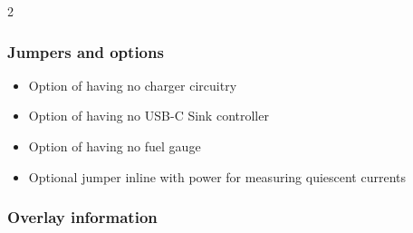 \documentclass[11px]{specification}
\begin{document}
\begin{multicols}{2}
\subsubsection{Jumpers and options}
\begin{itemize}
    \item Option of having no charger circuitry
    \item Option of having no USB-C Sink controller
    \item Option of having no fuel gauge
    \item Optional jumper inline with power for measuring quiescent currents
\end{itemize}
\subsubsection{Overlay information}


\end{multicols}

\printindex[req]

\printbibliography[heading=bibintoc]
\end{document}

